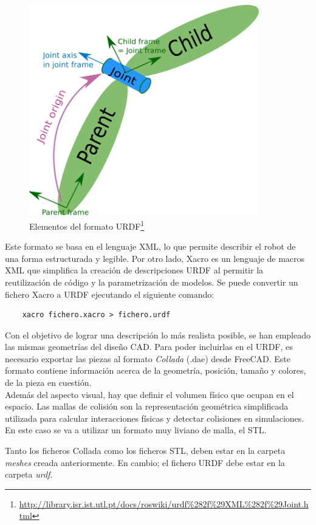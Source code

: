 \begin{figure} [ht!]
    \begin{center}
        \includegraphics[width=10cm]{figs/urdf.png}
    \end{center}
    \caption{Elementos del formato URDF\footnote{\url{http://library.isr.ist.utl.pt/docs/roswiki/urdf\%282f\%29XML\%282f\%29Joint.html}}}
\label{fig:urdf}
\end{figure}
Este formato se basa en el lenguaje \ac{XML}, lo que permite describir el robot de una forma 
estructurada y legible. Por otro lado, Xacro es un lenguaje de macros XML que simplifica la 
creación de descripciones URDF al permitir la reutilización de código y la parametrización 
de modelos. Se puede convertir un fichero Xacro a URDF ejecutando el siguiente comando:
\begin{verbatim}
    xacro fichero.xacro > fichero.urdf
\end{verbatim}
\newpage
Con el objetivo de lograr una descripción lo más realista posible, se han empleado las mismas geometrías del diseño \acs{CAD}.
Para poder incluirlas en el URDF, es necesario exportar las piezas al formato \textit{Collada} (.dae) desde FreeCAD. Este formato 
contiene información acerca de la geometría, posición, tamaño y colores, de la pieza en cuestión.
\\
Además del aspecto visual, hay que definir el volumen físico que ocupan en el espacio. Las mallas de colisión son la representación 
geométrica simplificada utilizada para calcular interacciones físicas y detectar colisiones en simulaciones. En este caso se va a utilizar 
un formato muy liviano de malla, el \ac{STL}. 

Tanto los ficheros Collada como los ficheros STL, deben estar en la carpeta \textit{meshes} creada anteriormente. En cambio; el fichero 
URDF debe estar en la carpeta \textit{urdf}.
\\

